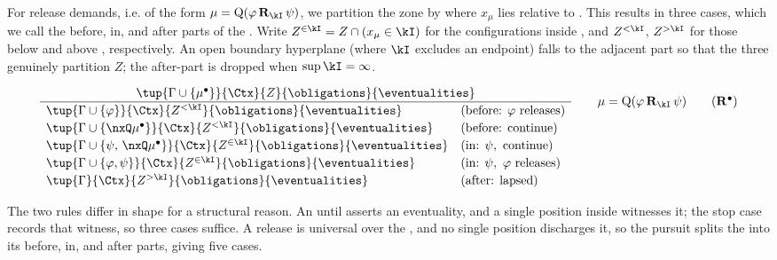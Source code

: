 For release demands, i.e. of the form $\mu=\mathrm{Q}(\varphi\,\mathbf{R}_\kI\,\psi)$, we partition the zone by where $x_\mu$ lies relative to \kI. This results in three cases, which we call the {before}, {in}, and {after} parts of the \kI. Write $Z^{\in\kI}=Z\cap(x_\mu\in\kI)$ for the configurations inside \kI, and $Z^{<\kI}$, $Z^{>\kI}$ for those below and above \kI, respectively. An open boundary hyperplane (where $\kI$ excludes an endpoint) falls to the adjacent part so that the three genuinely partition $Z$; the after-part is dropped when $\sup\kI=\infty$.


%



\[
\frac{\tup{\Gamma\cup\{\mu^\bullet\}}{\Ctx}{Z}{\obligations}{\eventualities}}
{\begin{array}{ll}
\tup{\Gamma\cup\{\varphi\}}{\Ctx}{Z^{<\kI}}{\obligations}{\eventualities} & (\text{before: }\varphi\text{ releases})\\[2pt]
\tup{\Gamma\cup\{\nxQ\mu^\bullet\}}{\Ctx}{Z^{<\kI}}{\obligations}{\eventualities} & (\text{before: continue})\\[2pt]
\tup{\Gamma\cup\{\psi,\,\nxQ\mu^\bullet\}}{\Ctx}{Z^{\in\kI}}{\obligations}{\eventualities} & (\text{in: }\psi,\text{ continue})\\[2pt]
\tup{\Gamma\cup\{\varphi,\psi\}}{\Ctx}{Z^{\in\kI}}{\obligations}{\eventualities} & (\text{in: }\psi,\ \varphi\text{ releases})\\[2pt]
\tup{\Gamma}{\Ctx}{Z^{>\kI}}{\obligations}{\eventualities} & (\text{after: lapsed})
\end{array}}
\qquad \mu=\mathrm{Q}(\varphi\,\mathbf{R}_\kI\,\psi)
\tag{$\mathbf{R}^\bullet$}\label{tag:Runf}
\]



The two rules differ in shape for a structural reason. An until asserts an eventuality, and a single position inside \kI witnesses it; the stop case records that witness, so three cases suffice. A release is universal over the \kI, and no single position discharges it, so the pursuit splits the \kI into its before, in, and after parts, giving five cases. 


